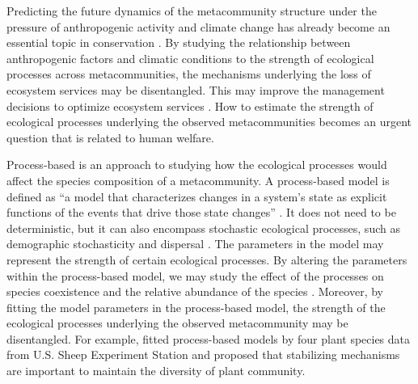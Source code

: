 Predicting the future dynamics of the metacommunity structure under the pressure of anthropogenic activity and climate change has already become an essential topic in conservation \citep{clark2001ecological, evans2012modelling, chase2020biodiversity}. By studying the relationship between anthropogenic factors and climatic conditions to the strength of ecological processes across metacommunities, the mechanisms underlying the loss of ecosystem services may be disentangled. This may improve the management decisions to optimize ecosystem services \citep{hodgson2019investigating, chase2020biodiversity}. How to estimate the strength of ecological processes underlying the observed metacommunities \DIFaddbegin {}\DIFaddend becomes an urgent question that is related to human welfare.

Process-based \DIFdelbegin {}\DIFdelend \DIFaddbegin {}\DIFaddend is an approach to studying how the ecological processes would affect the species composition of a metacommunity. A process-based model is defined as “a model that characterizes changes in a system's state as explicit functions of the events that drive those state changes” \citep{connolly2017process}. It does not need to be deterministic, but it can also encompass stochastic ecological processes, such as demographic stochasticity and dispersal \citep{connolly2017process}. The parameters in the model may represent the strength of certain ecological processes. By altering the parameters within the process-based model, we may study the effect of the processes on species coexistence \citep{adler2007niche, adler2010coexistence} and the relative abundance of the species \citep{ke2015soil}. Moreover, by fitting the model parameters in the process-based model, the strength of the ecological processes underlying the observed metacommunity may be disentangled. For example, \citet{adler2010coexistence} fitted \DIFdelbegin {}\DIFdelend process-based models by four plant species data from U.S. Sheep Experiment Station and proposed that stabilizing mechanisms are important to maintain the diversity of plant community.
\DIFdelbegin {}\DIFdelend 


